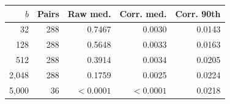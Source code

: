\begin{tabular}{rrrrr}
\hline
$b$ & Pairs & Raw med. & Corr. med. & Corr. 90th \\
\hline
32 & 288 & 0.7467 & 0.0030 & 0.0143 \\
128 & 288 & 0.5648 & 0.0033 & 0.0163 \\
512 & 288 & 0.3914 & 0.0034 & 0.0205 \\
2,048 & 288 & 0.1759 & 0.0025 & 0.0224 \\
5,000 & 36 & $<0.0001$ & $<0.0001$ & 0.0218 \\
\hline
\end{tabular}
